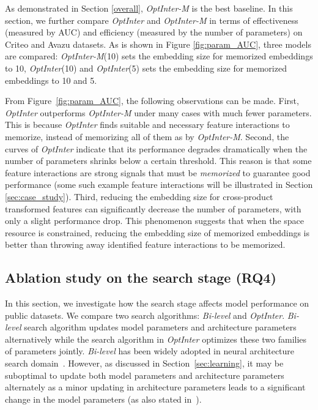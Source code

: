 \documentclass[conference]{IEEEtran}
\begin{document}
As demonstrated in Section \ref{overall}, \textit{OptInter-M} is the best baseline. 
In this section, we further compare \textit{OptInter} and \textit{OptInter-M} in terms of effectiveness (measured by AUC) and efficiency (measured by the number of parameters) on Criteo and Avazu datasets. 
As is shown in Figure \ref{fig:param_AUC}, three models are compared: \textit{OptInter-M}(10) sets the embedding size for memorized embeddings to 10, \textit{OptInter}(10) and \textit{OptInter}(5) sets the embedding size for memorized embeddings to 10 and 5.   

From Figure~\ref{fig:param_AUC}, the following observations can be made.
First, \textit{OptInter} outperforms \textit{OptInter-M} under many cases with much fewer parameters. This is because \textit{OptInter} finds suitable and necessary feature interactions to memorize, instead of memorizing all of them as by \textit{OptInter-M}. 
Second, the curves of \textit{OptInter} indicate that its performance degrades dramatically when the number of parameters shrinks below a certain threshold. 
This reason is that some feature interactions are strong signals that must be \emph{memorized} to guarantee good performance (some such example feature interactions will be illustrated in Section \ref{sec:case_study}). 
Third, reducing the embedding size for cross-product transformed features can significantly decrease the number of parameters, with only a slight performance drop. This phenomenon suggests that when the space resource is constrained, reducing the embedding size of memorized embeddings is better than throwing away identified feature interactions to be memorized.


\subsection{Ablation study on the search stage (RQ4)}
\label{sec:different_optim}
In this section, we investigate how the search stage affects model performance on public datasets. We compare two search algorithms: \textit{Bi-level} and \textit{OptInter}. \textit{Bi-level} search algorithm updates model parameters and architecture parameters alternatively while the search algorithm in \textit{OptInter} optimizes these two families of parameters jointly. \textit{Bi-level} has been widely adopted in neural architecture search domain~\cite{DARTS}. However, as discussed in Section~\ref{sec:learning}, it may be suboptimal to update both model parameters and architecture parameters alternately as a minor updating in architecture parameters leads to a significant change in the model parameters (as also stated in~\cite{AutoFis}). 
\end{document}
